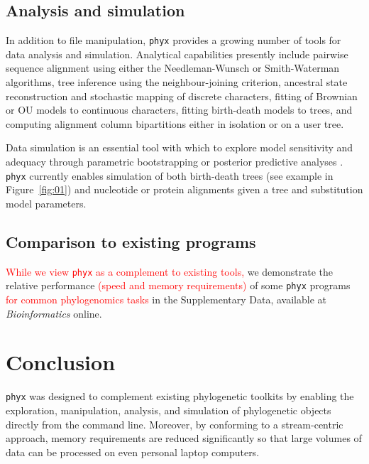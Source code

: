 \documentclass{bioinfo}
\begin{document}
\begin{methods}
\subsection{Analysis and simulation}

In addition to file manipulation, \texttt{phyx} provides a growing number of tools for data analysis and simulation. Analytical capabilities presently include pairwise sequence alignment using either the Needleman-Wunsch or Smith-Waterman algorithms, tree inference using the neighbour-joining criterion, ancestral state reconstruction and stochastic mapping of discrete characters, fitting of Brownian or OU models to continuous characters, fitting birth-death models to trees, and computing alignment column bipartitions either in isolation or on a user tree.

Data simulation is an essential tool with which to explore model sensitivity and adequacy through parametric bootstrapping or posterior predictive analyses \citep{Bollback2002}. \texttt{phyx} currently enables simulation of both birth-death trees (see example in Figure~\ref{fig:01}) and nucleotide or protein alignments given a tree and substitution model parameters.

\subsection{Comparison to existing programs}
\textcolor{red}{While we view \texttt{phyx} as a complement to existing tools,} we demonstrate the relative performance \textcolor{red}{(speed and memory requirements)} of some \texttt{phyx} programs \textcolor{red}{for common phylogenomics tasks} in the Supplementary Data, available at \textit{Bioinformatics} online.

\end{methods}

\section{Conclusion}

\texttt{phyx} was designed to complement existing phylogenetic toolkits by enabling the exploration, manipulation, analysis, and simulation of phylogenetic objects directly from the command line. Moreover, by conforming to a stream-centric approach, memory requirements are reduced significantly so that large volumes of data can be processed on even personal laptop computers.\vspace*{-10pt}
\end{document}
